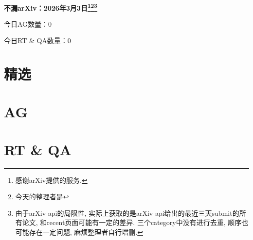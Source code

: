 \documentclass[9pt, a4paper]{article}
\theoremstyle{plain}
\theoremstyle{definition}
\theoremstyle{remark}
\newcommand{\AGnumber}{0}
\newcommand{\RTQAnumber}{0}
\newcommand{\NewestDate}{2026年3月3日}
\newcommand{\todayarXiver}{} %
\begin{document}
\begin{center}
    \Huge\textbf{不漏arXiv：\NewestDate\footnote{感谢arXiv提供的服务.}\footnote{今天的整理者是\todayarXiver}\footnote{由于arXiv api的局限性, 实际上获取的是arXiv api给出的最近三天submit的所有论文, 和recent页面可能有一定的差异. 三个category中没有进行去重, 顺序也可能存在一定问题, 麻烦整理者自行增删.}} \\
\end{center}

\setcounter{section}{-1}

\begin{center}
    今日AG数量：\AGnumber
    
    今日RT \& QA数量：\RTQAnumber
    
\end{center}


\section{精选}


\section{AG}

\section{RT \& QA}
\end{document}
